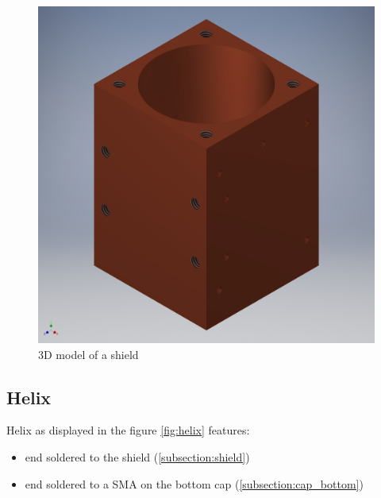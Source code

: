 \begin{figure}[h]
	\centering
	\includegraphics[width=\textwidth]{images/shield}
	\caption{3D model of a shield}
	\label{fig:shield}
\end{figure}

\clearpage
\subsection{Helix}
\label{subsection:helix}
Helix as displayed in the figure \ref{fig:helix} features:
\begin{itemize}
	\item end soldered to the shield (\ref{subsection:shield})
	\item end soldered to a SMA on the bottom cap (\ref{subsection:cap_bottom})
\end{itemize}

